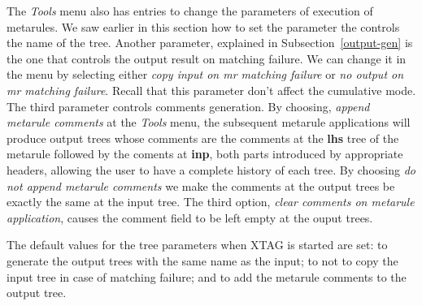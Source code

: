 The {\it Tools} menu also has entries to change the parameters of execution
of metarules. We saw earlier in this section how to set the parameter the 
controls the name of the tree. Another parameter, explained in 
Subsection~\ref{output-gen} is the one that 
controls the output result on matching failure. We can change it in the menu  
by selecting
either {\it copy input on mr matching failure} or 
{\it no output on mr matching failure}. Recall that this parameter don't
affect the cumulative mode.
The third parameter controls comments generation. By choosing,
{\it append metarule comments} at the {\it Tools} menu, the subsequent
metarule applications will produce output trees whose comments
are the comments at the {\bf lhs}
tree of the metarule followed by the coments at {\bf inp}, both parts 
introduced by appropriate headers, allowing the user to have a complete
history of each tree. By choosing
{\it do not append metarule comments} we make the comments at the output
trees be exactly the same at the input tree. The third option, 
{\it clear comments on metarule application}, causes the comment field 
to be left empty at the ouput trees.

The default values for the tree parameters when XTAG is started are set:
to generate the output trees with the same name as the input; to not to copy
the input tree in case of matching failure; and to add the metarule comments
to the output tree.

